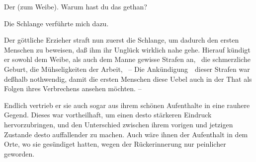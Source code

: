 \begin{RWanm}
\begin{aufza}
Der  (zum Weibe). Warum hast du das gethan?\par
{} Die Schlange verführte mich dazu.\par
Der göttliche Erzieher straft nun zuerst die Schlange, um dadurch den ersten Menschen zu beweisen, daß ihm ihr Unglück wirklich nahe gehe. Hierauf kündigt er sowohl dem Weibe, als auch dem Manne gewisse Strafen an, \zB\ die schmerzliche Geburt, die Mühseligkeiten der Arbeit, \usw\ -- Die Ankündigung~\ dieser Strafen war deßhalb nothwendig, damit die ersten Menschen diese Uebel auch in der That als Folgen ihres Verbrechens ansehen möchten. --
\item Endlich vertrieb er sie auch sogar aus ihrem schönen Aufenthalte in eine rauhere Gegend. Dieses war vortheilhaft, um einen desto stärkeren Eindruck hervorzubringen, und den Unterschied zwischen ihrem vorigen und jetzigen Zustande desto auffallender zu machen. Auch wäre ihnen der Aufenthalt in dem Orte, wo sie gesündiget hatten, wegen der Rückerinnerung nur peinlicher geworden.
\end{aufza} 
\end{RWanm}

